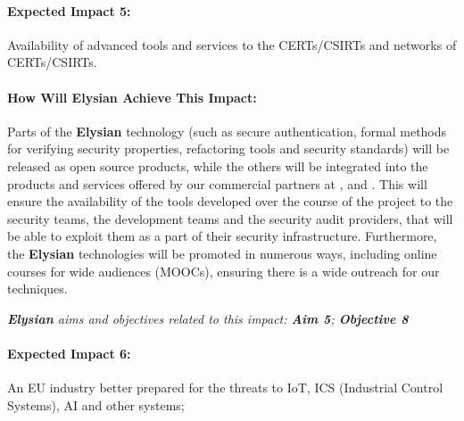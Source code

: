 \documentclass[a4paper,11pt]{article}
\newcommand{\project}[1]{\textbf{#1}\xspace}
\newcommand{\SECURITY}{\project{Elysian}}
\newcommand{\TheProject}{\SECURITY}
\begin{document}
\begin{mdframed}[backgroundcolor=blue!5]
\paragraph{Expected Impact 5:}
Availability of advanced tools and services to the CERTs/CSIRTs and networks of CERTs/CSIRTs.
\end{mdframed}

\begin{mdframed}[backgroundcolor=gray!10]
\paragraph{How Will \TheProject{} Achieve This Impact:}
Parts of the \TheProject{} technology (such as secure authentication, formal methods for verifying security properties, refactoring tools and security standards) will be released as open source products, while the others will be integrated into the products and services offered by our commercial partners at \IBMshort{}, \YAGshort{} and \SOPRAshort{}. This will ensure the availability of the tools developed over the course of the project to the security teams, the development teams and the security audit providers, that will be able to exploit them as a part of their security infrastructure. Furthermore, the \TheProject{} technologies will be promoted in numerous ways, including online courses for wide audiences (MOOCs), ensuring there is a wide outreach for our techniques.

\emph{\TheProject{} aims and objectives related to this impact: \textbf{Aim 5}; \textbf{Objective 8} }

\end{mdframed}

\begin{mdframed}[backgroundcolor=blue!5]
\paragraph{Expected Impact 6:}
An EU industry better prepared for the threats to IoT, ICS (Industrial Control Systems), AI and other systems;
\end{mdframed}
\end{document}

